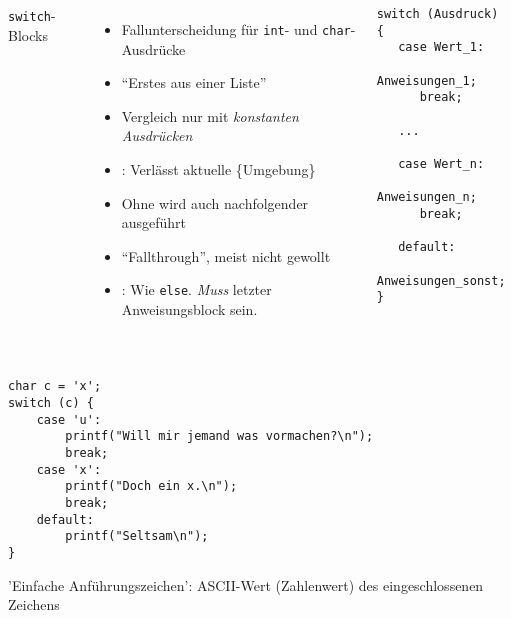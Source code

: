 \begin{frame}[fragile]
%
\begin{columns}[T]
\begin{Large}
{\texttt{switch}-Blocks}
\vspace{6pt}
\end{Large}
\begin{itemize}
\item Fallunterscheidung für \texttt{int}- und \texttt{char}-Ausdrücke
\item \enquote{Erstes aus einer Liste}
\item Vergleich nur mit \emph{konstanten Ausdrücken}
\item {}: Verlässt aktuelle \{Umgebung\}
\item Ohne  wird auch nachfolgender  ausgeführt
\item \enquote{Fallthrough}, meist nicht gewollt
\item {}: Wie \texttt{else}.\newline
	\emph{Muss} letzter Anweisungsblock sein.
\end{itemize}
%
\begin{codebox}[Syntax]
\begin{verbatim}
switch (Ausdruck) {
   case Wert_1:
      Anweisungen_1;
      break;

   ...

   case Wert_n:
      Anweisungen_n;
      break;
      
   default:
      Anweisungen_sonst;
}
\end{verbatim}
\end{codebox}
\end{columns}
%
\end{frame}


\begin{frame}[fragile]
%
\begin{codebox}
\begin{verbatim}

char c = 'x';
switch (c) {
    case 'u':
        printf("Will mir jemand was vormachen?\n");
        break;
    case 'x':
        printf("Doch ein x.\n");
        break;
    default:
        printf("Seltsam\n");
}
\end{verbatim}
\end{codebox}
%
\begin{hintbox}
\small 'Einfache Anführungszeichen': ASCII-Wert (Zahlenwert) des eingeschlossenen Zeichens
\end{hintbox}
%
\end{frame}
